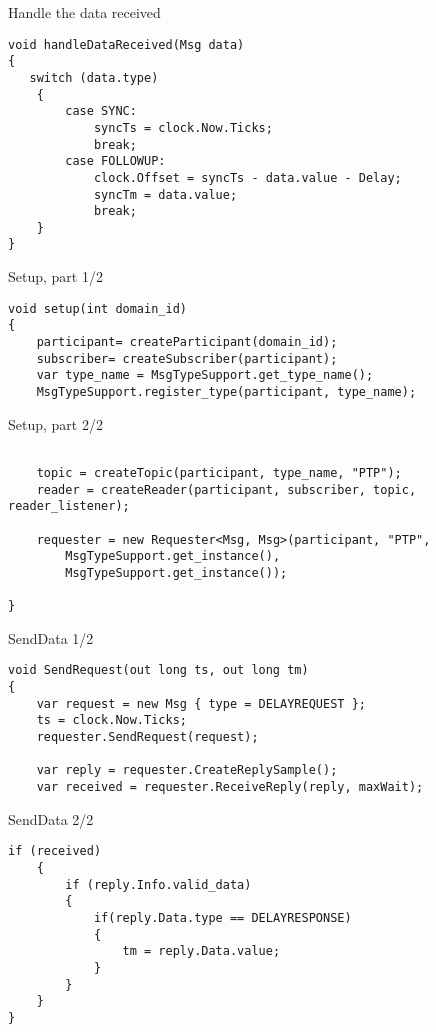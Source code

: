 \documentclass[compressed, presentation, notheorems, 12pt]{beamer}
\begin{document}
	\begin{frame}[containsverbatim]{Handle the data received}
	\begin{lstlisting}[style=Code-C++]
void handleDataReceived(Msg data)
{
   switch (data.type)
	{
		case SYNC:
			syncTs = clock.Now.Ticks;
			break;
		case FOLLOWUP:
			clock.Offset = syncTs - data.value - Delay;
			syncTm = data.value;
			break;
	}
}
	\end{lstlisting}
	\end{frame}




	\begin{frame}[containsverbatim]{Setup, part 1/2}
	\begin{lstlisting}[style=Code-C++]
void setup(int domain_id)
{
	participant= createParticipant(domain_id);
	subscriber= createSubscriber(participant);		
	var type_name = MsgTypeSupport.get_type_name();
	MsgTypeSupport.register_type(participant, type_name);

	\end{lstlisting}
	\end{frame}


	\begin{frame}[containsverbatim]{Setup, part 2/2}
	\begin{lstlisting}[style=Code-C++]

	topic = createTopic(participant, type_name, "PTP");
	reader = createReader(participant, subscriber, topic, reader_listener);

	requester = new Requester<Msg, Msg>(participant, "PTP",
		MsgTypeSupport.get_instance(),
		MsgTypeSupport.get_instance());

}
	\end{lstlisting}
	\end{frame}



	\begin{frame}[containsverbatim]{SendData 1/2}
	\begin{lstlisting}[style=Code-C++]
void SendRequest(out long ts, out long tm)
{
	var request = new Msg { type = DELAYREQUEST };
	ts = clock.Now.Ticks;
	requester.SendRequest(request);

	var reply = requester.CreateReplySample();
	var received = requester.ReceiveReply(reply, maxWait);

	\end{lstlisting}
	\end{frame}



	\begin{frame}[containsverbatim]{SendData 2/2}
	\begin{lstlisting}[style=Code-C++]
	if (received)
	{
		if (reply.Info.valid_data)
		{
			if(reply.Data.type == DELAYRESPONSE)
			{
				tm = reply.Data.value;
			}
		}
	}
}
	\end{lstlisting}
	\end{frame}
\end{document}
